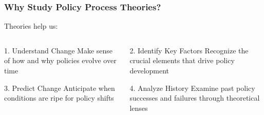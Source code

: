 \documentclass[10pt]{beamer}
\begin{document}
\begin{frame}
\frametitle{Why Study Policy Process Theories?}

\begin{block}{}
  \centering
  Theories help us:
\end{block}

\vspace{0.5cm}

\begin{columns}
  \begin{column}{0.48\textwidth}
    \begin{block}{1. Understand Change}
      \pause
      Make sense of how and why policies evolve over time
    \end{block}

    \vspace{0.3cm}

    \begin{block}{3. Predict Change}
      \pause
      Anticipate when conditions are ripe for policy shifts
    \end{block}
  \end{column}

  \begin{column}{0.48\textwidth}
    \begin{block}{2. Identify Key Factors}
      \pause
      Recognize the crucial elements that drive policy development
    \end{block}

    \vspace{0.3cm}

    \begin{block}{4. Analyze History}
      \pause
      Examine past policy successes and failures through theoretical lenses
    \end{block}
  \end{column}
\end{columns}

\end{frame}
\end{document}
